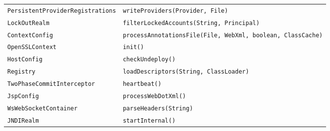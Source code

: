 \begin{center}
\begin{longtable}{ll}
 \lstinline/PersistentProviderRegistrations/&{\lstinline/writeProviders(Provider, File)/}\\
 \lstinline/LockOutRealm/&{\lstinline/filterLockedAccounts(String, Principal)/}\\
 \lstinline/ContextConfig/&{\lstinline/processAnnotationsFile(File, WebXml, boolean, ClassCache)/}\\
 \lstinline/OpenSSLContext/&{\hspace*{-2.5pt}\lstinline/init()/}\\
 \lstinline/HostConfig/&{\lstinline/checkUndeploy()/}\\
 \lstinline/Registry/&{\lstinline/loadDescriptors(String, ClassLoader)/}\\
 \lstinline/TwoPhaseCommitInterceptor/&{\lstinline/heartbeat()/}\\
 \lstinline/JspConfig/&{\lstinline/processWebDotXml()/}\\
 \lstinline/WsWebSocketContainer/&{\lstinline/parseHeaders(String)/}\\
 \lstinline/JNDIRealm/&{\hspace*{-3pt}\lstinline/startInternal()/}\\
\end{longtable}
\end{center}

